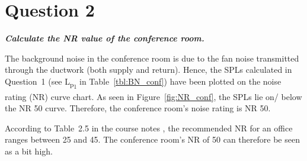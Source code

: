 \section{Question 2} \label{sec:Q2}

\textit{\textbf{Calculate the NR value of the conference room.}}

The background noise in the conference room is due to the fan noise transmitted through the ductwork (both supply and return).
Hence, the SPLs calculated in Question~1 (see L\textsubscript{p\textsubscript{1}} in Table~\ref{tbl:BN_conf}) have been plotted on the noise rating (NR) curve chart.
As seen in Figure~\ref{fig:NR_conf}, the SPLs lie on/ below the NR 50 curve.
Therefore, the conference room's noise rating is NR 50.

According to Table~2.5 in the course notes \citep{unit2}, the recommended NR for an office ranges between 25 and 45.
The conference room's NR of 50 can therefore be seen as a bit high.

